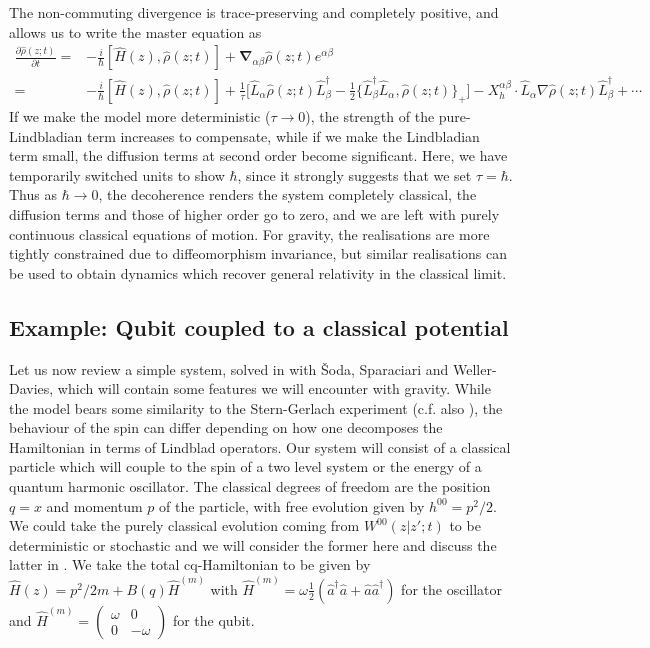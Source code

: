 \documentclass[aps,pra,showpacs,citeautoscript,amsmath,amssymb,floatfix,superscriptaddress,bbm, verbatim,amsfonts,changes,10pt,nofootinbib,longbibliography]{revtex4-1}
\def\z{{z}}
\def\L{{\hat{L}}}
\def\Hq{\hat{H}}
\def\Hqm{\hat{H}^{(m)}}
\def\baseab{e^{\alpha\beta}}
\def\PQdiv{\boldsymbol{\nabla}_{\alpha\beta}}
\def\rate{{W}}
\def\ab{^{\alpha\beta}}
\renewcommand{\varrho}{\hat{\rho}}
\def\psiz{{\varrho(\z;t)}}
\def\bfa{\hat{a}}
\begin{document}
The non-commuting divergence is trace-preserving and completely positive, and allows us to write the master equation as
\begin{align}
\frac{\partial\psiz}{\partial t}=
  &-\frac{i}{\hbar}[\Hq(\z),\psiz]
+\PQdiv\psiz\baseab
  \nonumber\\
  =& -\frac{i}{\hbar}[\Hq(\z),\psiz]
  +\frac{1}{\tau}
  \Big[
\L_\alpha\psiz\L^\dagger_\beta
-
\frac{1}{2}\{ \L^\dagger_\beta\L_\alpha,\psiz  \}_+
\Big]
 -X_h\ab\cdot\L_\alpha \nabla\psiz\L_\beta^\dagger
  +\cdots
\label{eq:simplemaster}
\end{align}
If we make the model more deterministic ($\tau\rightarrow 0$), the strength of the pure-Lindbladian term increases to compensate, while if we make the Lindbladian term small, the diffusion terms at second order become significant. Here, we have temporarily switched units to show $\hbar$, since it strongly suggests that we set $\tau=\hbar$. Thus as $\hbar\rightarrow 0$, the decoherence renders the system completely classical, the diffusion terms and those of higher order go to zero, and we are left with purely continuous classical equations of motion. For gravity, the realisations are more 
tightly constrained due to diffeomorphism invariance, but similar realisations can be used to obtain dynamics which recover general relativity in the classical limit. 


\subsection{Example: Qubit coupled to a classical potential}
\label{sec:qubit}

Let us now review a simple system, solved in \cite{UCLqubit} with Šoda, Sparaciari and Weller-Davies, which will contain some features we will encounter with gravity\cite{carlo_foot}.  While the model bears some similarity to the Stern-Gerlach experiment (c.f. also \cite{diosi2000quantum}), the behaviour of the spin can differ depending on how one decomposes the Hamiltonian in terms of Lindblad operators. 
Our system will consist of a classical particle which will couple to the spin of a two level system or the energy of a quantum harmonic oscillator. The classical degrees of freedom are the position $q=x$ and momentum $p$ of the particle, with free evolution given by $h^{00}=p^2/2$. We could take the purely classical evolution \label{par:pureclassical}coming from $\rate^{00}(\z|\z';t)$ to be deterministic or stochastic and we will consider the former here and discuss the latter in \cite{UCLqubit}.  We take the total cq-Hamiltonian to
be given by $\Hq(\z)=p^2/2m+B(q)\Hqm$ with $\Hqm=\omega \frac{1}{2}({\bfa}^\dagger{\bfa}+{\bfa}{\bfa}^\dagger)$ for the oscillator and 
$\Hqm=
\begin{pmatrix} \omega & 0\\ 0 & -\omega\end{pmatrix}$ for the qubit.
\end{document}

